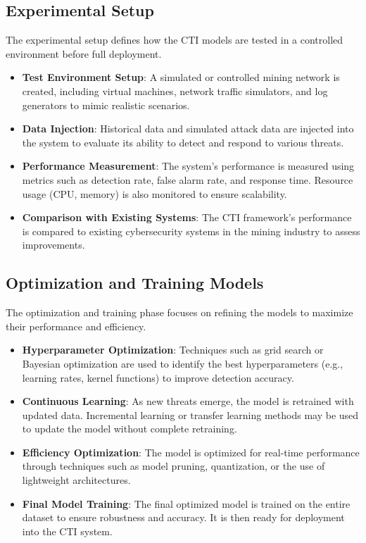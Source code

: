\documentclass[a4paper,twoside,12pt]{report}
\begin{document}
\subsection{Experimental Setup}
The experimental setup defines how the CTI models are tested in a controlled environment before full deployment.

\begin{itemize}
    \item \textbf{Test Environment Setup}: A simulated or controlled mining network is created, including virtual machines, network traffic simulators, and log generators to mimic realistic scenarios.
    \item \textbf{Data Injection}: Historical data and simulated attack data are injected into the system to evaluate its ability to detect and respond to various threats.
    \item \textbf{Performance Measurement}: The system’s performance is measured using metrics such as detection rate, false alarm rate, and response time. Resource usage (CPU, memory) is also monitored to ensure scalability.
    \item \textbf{Comparison with Existing Systems}: The CTI framework’s performance is compared to existing cybersecurity systems in the mining industry to assess improvements.
\end{itemize}

\subsection{Optimization and Training Models}
The optimization and training phase focuses on refining the models to maximize their performance and efficiency.

\begin{itemize}
    \item \textbf{Hyperparameter Optimization}: Techniques such as grid search or Bayesian optimization are used to identify the best hyperparameters (e.g., learning rates, kernel functions) to improve detection accuracy.
    \item \textbf{Continuous Learning}: As new threats emerge, the model is retrained with updated data. Incremental learning or transfer learning methods may be used to update the model without complete retraining.
    \item \textbf{Efficiency Optimization}: The model is optimized for real-time performance through techniques such as model pruning, quantization, or the use of lightweight architectures.
    \item \textbf{Final Model Training}: The final optimized model is trained on the entire dataset to ensure robustness and accuracy. It is then ready for deployment into the CTI system.
\end{itemize}
\end{document}
